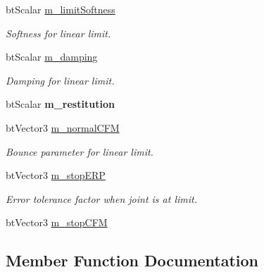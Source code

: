 \begin{DoxyCompactItemize}
\item 
bt\+Scalar \hyperlink{classbtTranslationalLimitMotor_aa557a6c4d83ca5cb5a942f8f4b236f74}{m\+\_\+limit\+Softness}
\begin{DoxyCompactList}\small\item\em Softness for linear limit. \end{DoxyCompactList}\item 
\mbox{\label{classbtTranslationalLimitMotor_ae82a9f720aca3ddba4b174f2dd3a2fd2}} 
bt\+Scalar \hyperlink{classbtTranslationalLimitMotor_ae82a9f720aca3ddba4b174f2dd3a2fd2}{m\+\_\+damping}
\begin{DoxyCompactList}\small\item\em Damping for linear limit. \end{DoxyCompactList}\item 
\mbox{\label{classbtTranslationalLimitMotor_ae456444a651dc2fa323055b130d0511e}} 
bt\+Scalar {\bfseries m\+\_\+restitution}
\item 
bt\+Vector3 \hyperlink{classbtTranslationalLimitMotor_a8970a726c2b50a0c60c0c8e079cc784f}{m\+\_\+normal\+C\+FM}
\begin{DoxyCompactList}\small\item\em Bounce parameter for linear limit. \end{DoxyCompactList}\item 
\mbox{\label{classbtTranslationalLimitMotor_a0320a9d4a9a46e7b8626ccd84f970228}} 
bt\+Vector3 \hyperlink{classbtTranslationalLimitMotor_a0320a9d4a9a46e7b8626ccd84f970228}{m\+\_\+stop\+E\+RP}
\begin{DoxyCompactList}\small\item\em Error tolerance factor when joint is at limit. \end{DoxyCompactList}\item 
bt\+Vector3 \hyperlink{classbtTranslationalLimitMotor_a531c6ae0a0805eaa4fc59a40982a67f8}{m\+\_\+stop\+C\+FM}
\end{DoxyCompactItemize}



\subsection{Member Function Documentation}
\mbox{\label{classbtTranslationalLimitMotor_ae5bb30b955dcd0923d72642e37f00622}} 
